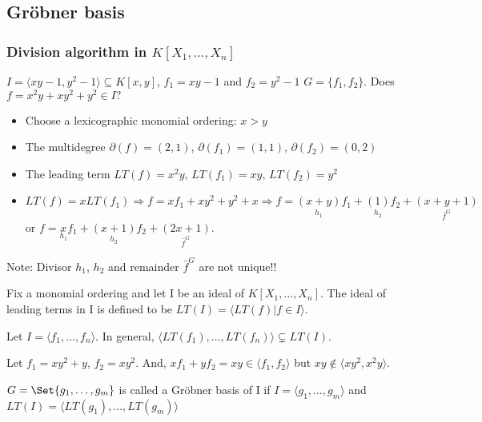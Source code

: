 \subsection{Gr\"{o}bner basis}

\subsubsection{Division algorithm in $K[X_1,\dots,X_n]$}

\begin{example}
  $I = \langle xy-1,y^2-1\rangle \subseteq K[x,y]$, $f_1 = xy-1$ and $f_2 = y^2-1$ $G=\{f_1,f_2\}$. Does $f = x^2y+xy^2+y^2 \in I?$
  \begin{itemize}
      \item Choose a lexicographic monomial ordering: $x > y$
      \item The multidegree $\partial(f) = (2,1)$, $\partial(f_1) = (1,1)$, $\partial(f_2) = (0,2)$
      \item The leading term $LT(f) = x^2y$, $LT(f_1) = xy$, $LT(f_2) = y^2$
      \item $LT(f) = xLT(f_1) \Rightarrow f = xf_1+xy^2+y^2+x \Rightarrow f = \underset{h_1}{(x+y)}f_1+\underset{h_2}{(1)}f_2+\underset{\bar{f}^G}{(x+y+1)}$ or $f = \underset{h_1}{x}f_1+\underset{h_2}{(x+1)}f_2+\underset{\bar{f}^G}{(2x+1)}$.
  \end{itemize}
  Note:  Divisor $h_1$, $h_2$ and remainder $\bar{f}^G$ are not unique!! 
\end{example}

\begin{definition}
  Fix a monomial ordering and let I be an ideal of $K[X_1,\dots,X_n]$. The ideal of leading terms in I is defined to be $LT(I) = \langle LT(f)|f\in I \rangle$.
\end{definition}

\begin{remark}
  Let $I = \langle f_1,\dots,f_n \rangle$. In general, $\langle LT(f_1),\dots,LT(f_n) \rangle \subsetneq LT(I)$.
\end{remark}

\begin{example}
  Let $f_1=xy^2+y$, $f_2=xy^2$. And, $xf_1+yf_2=xy \in \langle f_1,f_2 \rangle$ but $xy \notin \langle xy^2, x^2y \rangle$.
\end{example}

\begin{definition}
  $G = \Set{g_1,\dots,g_m}$ is called a Gr\"{o}bner basis of I if $I = \langle g_1,\dots,g_m \rangle$ and $LT(I) = \langle LT(g_1),\dots,LT(g_m) \rangle$
\end{definition}

